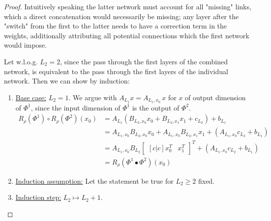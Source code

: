 \begin{proof}
    Intuitively speaking the latter network must account for all "missing" links, which a direct concatenation
    would necessarily be missing; any layer after the "switch" from the first to the latter needs to have a correction
    term in the weights, additionally attributing all potential connections which the first network would impose.
    

    Let w.l.o.g. $L_2 = 2$, since the pass through the first layers of the combined network, is equivalent
    to the pass through the first layers of the individual network. Then we can show by induction:
    \begin{enumerate}
        \item \underline{Base case:} $L_2 = 1$. We argue with $A_{L_1} x = A_{L_1, x_0} \, x$ for $x$ of output dimension of $\Phi^1$, since
        the input dimension of $\Phi^1$ is the output of $\Phi^2$.
        \begin{align*}
            R_\rho(\Phi^1) \circ R_\rho(\Phi^2) (x_0) &= A_{L_1} 
            \left(B_{L_2, x_0} x_0 + B_{L_2, x_1} x_1 + c_{L_2}\right) + b_{L_1} \\
            &= A_{L_1, x_0} B_{L_2, x_0} x_0 + A_{L_1, x_0} B_{L_2, x_1} x_1 + \left(A_{L_1, x_0} c_{L_2} + b_{L_1}\right) \\
            &= A_{L_1, x_0} B_{L_2} \begin{bmatrix}[c|c]x_0^T & x_{1}^T\end{bmatrix}^T + \left(A_{L_1, x_0} c_{L_2} + b_{L_1}\right) \\
            &= R_\rho(\Phi^1 \bullet \Phi^2) (x_0)
        \end{align*}
        \item \underline{Induction assumption:} Let the statement be true for $L_2 \geq 2$ fixed.
        \item \underline{Induction step:} $L_2 \mapsto L_2 + 1$.
    \end{enumerate}
\end{proof}